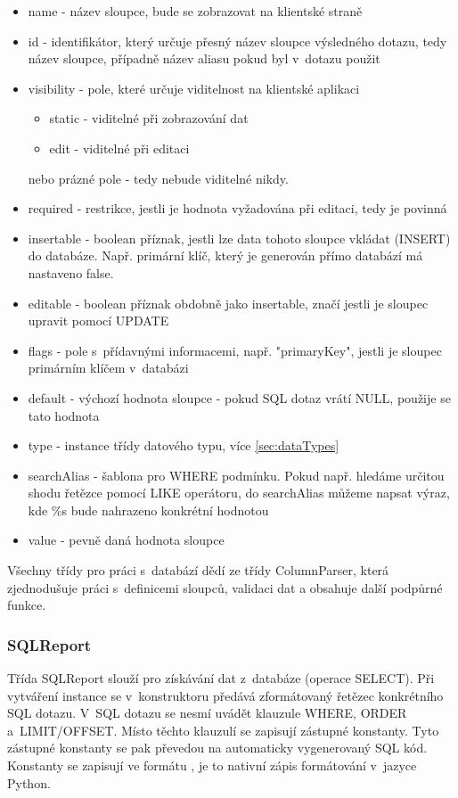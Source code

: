 \documentclass[bc,male,html,dept460]{diploma}				%
\begin{document}
\begin{itemize}
\item name - název sloupce, bude se zobrazovat na klientské straně
\item id - identifikátor, který určuje přesný název sloupce výsledného dotazu, tedy název sloupce, případně název aliasu pokud byl v~dotazu použit
\item visibility - pole, které určuje viditelnost na klientské aplikaci
	\begin{itemize}
		\item static - viditelné při zobrazování dat
		\item edit - viditelné při editaci
	\end{itemize}
	nebo prázné pole - tedy nebude viditelné nikdy.
\item required - restrikce, jestli je hodnota vyžadována při editaci, tedy je povinná
\item insertable - boolean příznak, jestli lze data tohoto sloupce vkládat (INSERT) do databáze. Např. primární klíč, který je generován přímo databází má nastaveno false.
\item editable - boolean příznak obdobně jako insertable, značí jestli je sloupec upravit pomocí UPDATE
\item flags - pole s~přídavnými informacemi, např. "primaryKey", jestli je sloupec primárním klíčem v~databázi
\item default - výchozí hodnota sloupce - pokud SQL dotaz vrátí NULL, použije se tato hodnota
\item type - instance třídy datového typu, více \ref{sec:dataTypes}
\item searchAlias - šablona pro WHERE podmínku. Pokud např. hledáme určitou shodu řetězce pomocí LIKE operátoru, do searchAlias můžeme napsat výraz, kde \%s bude nahrazeno konkrétní hodnotou
\item value - pevně daná hodnota sloupce
\end{itemize}

Všechny třídy pro práci s~databází dědí ze třídy ColumnParser, která zjednodušuje práci s~definicemi sloupců, validaci dat a obsahuje další podpůrné funkce.

\subsubsection{SQLReport}

Třída SQLReport slouží pro získávání dat z~databáze (operace SELECT). Při vytváření instance se v~konstruktoru předává zformátovaný řetězec konkrétního SQL dotazu. V~SQL dotazu se nesmí uvádět klauzule WHERE, ORDER a~LIMIT/OFFSET. Místo těchto klauzulí se zapisují zástupné konstanty. Tyto zástupné konstanty se pak převedou na automaticky vygenerovaný SQL kód. Konstanty se zapisují ve formátu , je to nativní zápis formátování v~jazyce Python.
\end{document}
